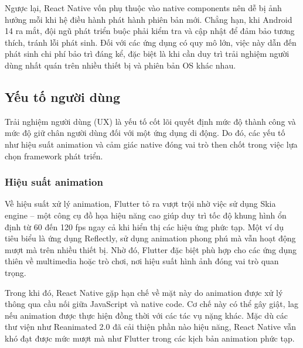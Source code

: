     \vspace{0.5em}

    \hspace*{1.5em}Ngược lại, React Native vốn phụ thuộc vào native components nên dễ bị ảnh hưởng mỗi khi hệ điều hành phát hành phiên bản mới. Chẳng hạn, khi Android 14 ra mắt, đội ngũ phát triển buộc phải kiểm tra và cập nhật để đảm bảo tương thích, tránh lỗi phát sinh. Đối với các ứng dụng có quy mô lớn, việc này dẫn đến phát sinh chi phí bảo trì đáng kể, đặc biệt là khi cần duy trì trải nghiệm người dùng nhất quán trên nhiều thiết bị và phiên bản OS khác nhau.
\vspace{0.5em}

\subsection{Yếu tố người dùng}


    \hspace*{0.8cm}Trải nghiệm người dùng (UX) là yếu tố cốt lõi quyết định mức độ thành công và mức độ giữ chân người dùng đối với một ứng dụng di động. Do đó, các yếu tố như hiệu suất animation và cảm giác native đóng vai trò then chốt trong việc lựa chọn framework phát triển.
\vspace{0.5em}

\subsubsection{Hiệu suất animation}


    \hspace*{0.8cm}Về hiệu suất xử lý animation, Flutter tỏ ra vượt trội nhờ việc sử dụng Skia engine – một công cụ đồ họa hiệu năng cao giúp duy trì tốc độ khung hình ổn định từ 60 đến 120 fps ngay cả khi hiển thị các hiệu ứng phức tạp. Một ví dụ tiêu biểu là ứng dụng Reflectly, sử dụng animation phong phú mà vẫn hoạt động mượt mà trên nhiều thiết bị. Nhờ đó, Flutter đặc biệt phù hợp cho các ứng dụng thiên về multimedia hoặc trò chơi, nơi hiệu suất hình ảnh đóng vai trò quan trọng.

    \vspace{0.5em}

    \hspace*{1.5em}Trong khi đó, React Native gặp hạn chế về mặt này do animation được xử lý thông qua cầu nối giữa JavaScript và native code. Cơ chế này có thể gây giật, lag nếu animation được thực hiện đồng thời với các tác vụ nặng khác. Mặc dù các thư viện như Reanimated 2.0 đã cải thiện phần nào hiệu năng, React Native vẫn khó đạt được mức mượt mà như Flutter trong các kịch bản animation phức tạp.
\vspace{0.5em}

